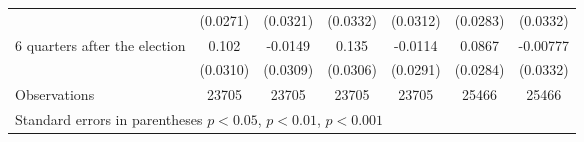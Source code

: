 \begin{table}[!ht]
\begin{tabular}{l*{6}{c}}
                    &    (0.0271)         &    (0.0321)         &    (0.0332)         &    (0.0312)         &    (0.0283)         &    (0.0332)         \\
[0,12em]
 6 quarters after the election&       0.102\sym{***}&     -0.0149         &       0.135\sym{***}&     -0.0114         &      0.0867\sym{**} &    -0.00777         \\
                    &    (0.0310)         &    (0.0309)         &    (0.0306)         &    (0.0291)         &    (0.0284)         &    (0.0332)         \\
\hline
Observations        &       23705         &       23705         &       23705         &       23705         &       25466         &       25466         \\
\hline\hline
\multicolumn{7}{l}{ Standard errors in parentheses \sym{*} \(p<0.05\), \sym{**} \(p<0.01\), \sym{***} \(p<0.001\)}\\\end{tabular}
\end{table}
